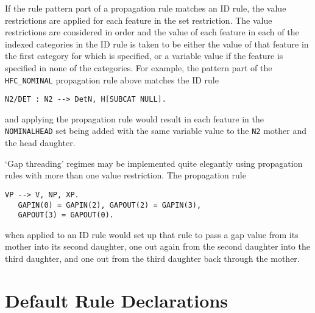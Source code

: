 If the rule pattern part of a propagation rule matches an ID rule, the
value restrictions are applied for each feature in the set restriction.
The value restrictions are considered in order and the value of each
feature in each of the indexed categories in the ID rule is taken to be
either the value of that feature in the first category for which is
specified, or a variable value if the feature is specified in none of
the categories. For example, the pattern part of the {\tt HFC\_NOMINAL}
propagation rule above matches the ID rule
\begin{ex}
\begin{verbatim}
N2/DET : N2 --> DetN, H[SUBCAT NULL].
\end{verbatim}
\end{ex}
and applying the propagation rule would result in each feature
in the {\tt NOMINALHEAD} set being added with the same variable value
to the {\tt N2} mother and the head daughter.

`Gap threading' regimes may be implemented quite elegantly using propagation
rules with more than one value restriction. The propagation rule
\begin{ex}
\begin{verbatim}
VP --> V, NP, XP.
   GAPIN(0) = GAPIN(2), GAPOUT(2) = GAPIN(3),
   GAPOUT(3) = GAPOUT(0).
\end{verbatim}
\end{ex}
when applied to an ID rule would set up that rule to pass a gap value from its
mother into its second daughter, one out again from the second daughter into
the third daughter, and one out from the third daughter back through the mother.

\section{Default Rule Declarations}

